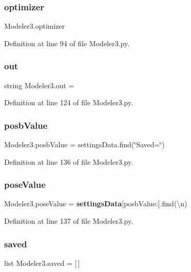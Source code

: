\subsubsection{optimizer}
{\footnotesize\ttfamily Modeler3.\+optimizer}



Definition at line 94 of file Modeler3.\+py.

\mbox{\label{namespace_modeler3_aaad5f141e4839d50df08d197a61cf154}} 
\subsubsection{out}
{\footnotesize\ttfamily string Modeler3.\+out = \textquotesingle{}\textquotesingle{}}



Definition at line 124 of file Modeler3.\+py.

\mbox{\label{namespace_modeler3_ad5354d15d9f38f0836b66102deaf03b8}} 
\subsubsection{posb\+Value}
{\footnotesize\ttfamily Modeler3.\+posb\+Value = settings\+Data.\+find(\char`\"{}Saved=\char`\"{})}



Definition at line 136 of file Modeler3.\+py.

\mbox{\label{namespace_modeler3_a3d7009f809c2db4e73f2cf7626bd68e1}} 
\subsubsection{pose\+Value}
{\footnotesize\ttfamily Modeler3.\+pose\+Value = \textbf{ settings\+Data}[posb\+Value\+:].find(\textquotesingle{}\textbackslash{}n\textquotesingle{})}



Definition at line 137 of file Modeler3.\+py.

\mbox{\label{namespace_modeler3_a63b0d4b2b01b68071408120043658086}} 
\subsubsection{saved}
{\footnotesize\ttfamily list Modeler3.\+saved = [$\,$]}



